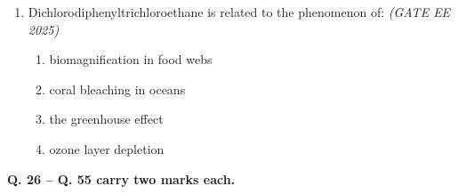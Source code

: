 \begin{enumerate}[leftmargin=*,label=\textbf{Q.\arabic*},resume]
\item Dichlorodiphenyltrichloroethane is related to the phenomenon of: \hfill \textit{(GATE EE 2025)}
\begin{multicols}{2}
\begin{enumerate}[label=(\Alph*)]
\item biomagnification in food webs
\item coral bleaching in oceans
\item the greenhouse effect
\item ozone layer depletion
\end{enumerate}
\end{multicols}

\end{enumerate}
\newpage
{}

\noindent \textbf{Q. 26 -- Q. 55 carry two marks each.}

